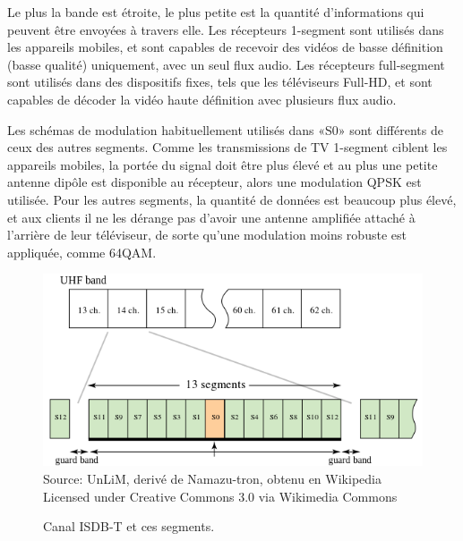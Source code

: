 \documentclass[12pt,a4paper]{article}
\begin{document}
Le plus la bande est étroite, le plus petite est la quantité d'informations qui peuvent être envoyées à travers elle. Les récepteurs 1-segment sont utilisés dans les appareils mobiles, et sont capables de recevoir des vidéos de basse définition (basse qualité) uniquement, avec un seul flux audio. Les récepteurs full-segment sont utilisés dans des dispositifs fixes, tels que les téléviseurs Full-HD, et sont capables de décoder la vidéo haute définition avec plusieurs flux audio.

Les schémas de modulation habituellement utilisés dans «S0» sont différents de ceux des autres segments. Comme les transmissions de TV 1-segment ciblent les appareils mobiles, la portée du signal doit être plus élevé et au plus une petite antenne dipôle est disponible au récepteur, alors une modulation QPSK est utilisée. Pour les autres segments, la quantité de données est beaucoup plus élevé, et aux clients il ne les dérange pas d'avoir une antenne amplifiée attaché à l'arrière de leur téléviseur, de sorte qu'une modulation moins robuste est appliquée, comme 64QAM.

\begin{figure}[!h]
\centering
\caption{Canal ISDB-T et ces segments.}
\includegraphics[width=0.8\linewidth]{pictures/ISDB-T_CH_Seg_Prog_allocation.png}
\\ Source: UnLiM, derivé de Namazu-tron, obtenu en Wikipedia \cite{ISDB_wiki}
\\ Licensed under Creative Commons 3.0 via Wikimedia Commons
\label{fig:ISDB-T_CH_Seg_Prog_allocation}
\end{figure}


\end{document}
